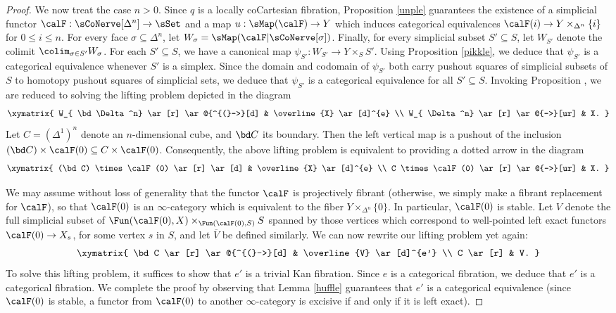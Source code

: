 \begin{proof}
We now treat the case $n > 0$. Since $q$ is a locally coCartesian fibration,
Proposition \ref{unple} guarantees the existence of a simplicial functor
$\calF: \sCoNerve[ \Delta^n ] \rightarrow \sSet$ and a map $u: \sMap(\calF) \rightarrow Y$
which induces categorical equivalences $\calF(i) \rightarrow Y \times_{ \Delta^n} \{i\}$ for
$0 \leq i \leq n$. For every face $\sigma \subseteq \Delta^n$, let
$W_{\sigma} = \sMap( \calF | \sCoNerve[\sigma])$. Finally, for every
simplicial subset $S' \subseteq S$, let $W_{S'}$ denote the colimit
$\colim_{ \sigma \in S'} W_{\sigma}$. For each $S' \subseteq S$, we have a canonical map
$\psi_{S'}: W_{S'} \rightarrow Y \times_{S} S'$. Using Proposition \ref{pikkle}, we deduce
that $\psi_{S'}$ is a categorical equivalence whenever $S'$ is a simplex. Since the domain
and codomain of $\psi_{S'}$ both carry pushout squares of simplicial subsets of $S$
to homotopy pushout squares of simplicial sets, we deduce that $\psi_{S'}$ is a categorical
equivalence for all $S' \subseteq S$. Invoking Proposition , we are reduced
to solving the lifting problem depicted in the diagram
$$ \xymatrix{ W_{ \bd \Delta^n} \ar[r] \ar@{^{(}->}[d] & \overline{X} \ar[d]^{e} \\
W_{ \Delta^n} \ar[r] \ar@{-->}[ur] & X. }$$
Let $C = ( \Delta^1)^{n}$ denote an $n$-dimensional cube, and $\bd C$ its boundary.
Then the left vertical map is a pushout of the inclusion $(\bd C) \times \calF(0) \subseteq
C \times \calF(0)$. Consequently, the above lifting problem is equivalent to providing
a dotted arrow in the diagram
$$ \xymatrix{ (\bd C) \times \calF(0) \ar[r] \ar[d] & \overline{X} \ar[d]^{e} \\
C \times \calF(0) \ar[r] \ar@{-->}[ur] & X. }$$

We may assume without loss of generality that the functor $\calF$ is projectively fibrant
(otherwise, we simply make a fibrant replacement for $\calF$), so that $\calF(0)$ is an
$\infty$-category which is equivalent to the fiber $Y \times_{ \Delta^n} \{0\}$.
In particular, $\calF(0)$ is stable. Let $V$ denote the full simplicial subset of $\Fun( \calF(0), X) \times_{ \Fun( \calF(0), S)} S$ spanned by those vertices which correspond to well-pointed left
exact functors $\calF(0) \rightarrow X_{s}$, for some vertex $s$ in $S$, and let
$\overline{V}$ be defined similarly. We can now rewrite our lifting problem yet again:
$$ \xymatrix{ \bd C \ar[r] \ar@{^{(}->}[d] & \overline{V} \ar[d]^{e'} \\
C \ar[r] & V. }$$
To solve this lifting problem, it suffices to show that $e'$ is a trivial Kan fibration.
Since $e$ is a categorical fibration, we deduce that $e'$ is a categorical fibration.
We complete the proof by observing that Lemma \ref{huffle} guarantees that
$e'$ is a categorical equivalence (since $\calF(0)$ is stable, a functor from
$\calF(0)$ to another $\infty$-category is excisive if and only if it is left exact).
\end{proof}


